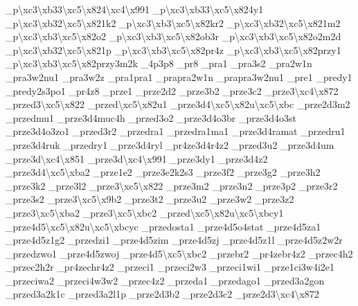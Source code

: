 \begin{DoxyCompactItemize}
\-\_\-p\textbackslash{}xc3\textbackslash{}xb33\textbackslash{}xc5\textbackslash{}x824\textbackslash{}xc4\textbackslash{}x991 \-\_\-p\textbackslash{}xc3\textbackslash{}xb33\textbackslash{}xc5\textbackslash{}x824y1 \-\_\-p\textbackslash{}xc3\textbackslash{}xb32\textbackslash{}xc5\textbackslash{}x821k2 \-\_\-p\textbackslash{}xc3\textbackslash{}xb3\textbackslash{}xc5\textbackslash{}x82kr2 \-\_\-p\textbackslash{}xc3\textbackslash{}xb32\textbackslash{}xc5\textbackslash{}x821m2 \-\_\-p\textbackslash{}xc3\textbackslash{}xb3\textbackslash{}xc5\textbackslash{}x82o2 \-\_\-p\textbackslash{}xc3\textbackslash{}xb3\textbackslash{}xc5\textbackslash{}x82ob3r \-\_\-p\textbackslash{}xc3\textbackslash{}xb3\textbackslash{}xc5\textbackslash{}x82o2m2d \-\_\-p\textbackslash{}xc3\textbackslash{}xb32\textbackslash{}xc5\textbackslash{}x821p \-\_\-p\textbackslash{}xc3\textbackslash{}xb3\textbackslash{}xc5\textbackslash{}x82pr4z \-\_\-p\textbackslash{}xc3\textbackslash{}xb3\textbackslash{}xc5\textbackslash{}x82przy1 \-\_\-p\textbackslash{}xc3\textbackslash{}xb3\textbackslash{}xc5\textbackslash{}x82przy3m2k \-\_\-4p3p8 \-\_\-pr8 \-\_\-pra1 \-\_\-pra3s2 \-\_\-pra2w1n \-\_\-pra3w2nu1 \-\_\-pra3w2z \-\_\-pra1pra1 \-\_\-prapra2w1n \-\_\-prapra3w2nu1 \-\_\-pre1 \-\_\-predy1 \-\_\-predy2s3po1 \-\_\-pr4z8 \-\_\-prze1 \-\_\-prze2d2 \-\_\-prze3b2 \-\_\-prze3c2 \-\_\-prze3\textbackslash{}xc4\textbackslash{}x872 \-\_\-przed3\textbackslash{}xc5\textbackslash{}x822 \-\_\-przed\textbackslash{}xc5\textbackslash{}x82u1 \-\_\-prze3d4\textbackslash{}xc5\textbackslash{}x82u\textbackslash{}xc5\textbackslash{}xbc \-\_\-prze2d3m2 \-\_\-przedmu1 \-\_\-prze3d4muc4h \-\_\-przed3o2 \-\_\-prze3d4o3br \-\_\-prze3d4o3st \-\_\-prze3d4o3zo1 \-\_\-przed3r2 \-\_\-przedra1 \-\_\-przedra1ma1 \-\_\-prze3d4ramat \-\_\-przedru1 \-\_\-prze3d4ruk \-\_\-przedry1 \-\_\-prze3d4ryl \-\_\-pr4ze3d4r4z2 \-\_\-przed3u2 \-\_\-prze3d4um \-\_\-prze3d\textbackslash{}xc4\textbackslash{}x851 \-\_\-prze3d\textbackslash{}xc4\textbackslash{}x991 \-\_\-prze3dy1 \-\_\-prze3d4z2 \-\_\-prze3d4\textbackslash{}xc5\textbackslash{}xba2 \-\_\-prze1e2 \-\_\-prze3e2k2s3 \-\_\-prze3f2 \-\_\-prze3g2 \-\_\-prze3h2 \-\_\-prze3k2 \-\_\-prze3l2 \-\_\-prze3\textbackslash{}xc5\textbackslash{}x822 \-\_\-prze3m2 \-\_\-prze3n2 \-\_\-prze3p2 \-\_\-prze3r2 \-\_\-prze3s2 \-\_\-prze3\textbackslash{}xc5\textbackslash{}x9b2 \-\_\-prze3t2 \-\_\-prze3u2 \-\_\-prze3w2 \-\_\-prze3z2 \-\_\-prze3\textbackslash{}xc5\textbackslash{}xba2 \-\_\-prze3\textbackslash{}xc5\textbackslash{}xbc2 \-\_\-przed\textbackslash{}xc5\textbackslash{}x82u\textbackslash{}xc5\textbackslash{}xbcy1 \-\_\-prze4d5\textbackslash{}xc5\textbackslash{}x82u\textbackslash{}xc5\textbackslash{}xbcyc \-\_\-przedosta1 \-\_\-prze4d5o4stat \-\_\-prze4d5za1 \-\_\-prze4d5z1g2 \-\_\-przedzi1 \-\_\-prze4d5zim \-\_\-prze4d5zj \-\_\-prze4d5z1l \-\_\-prze4d5z2w2r \-\_\-przedzwo1 \-\_\-prze4d5zwoj \-\_\-prze4d5\textbackslash{}xc5\textbackslash{}xbc2 \-\_\-przebr2 \-\_\-pr4zebr4z2 \-\_\-przec4h2 \-\_\-przec2h2r \-\_\-pr4zechr4z2 \-\_\-przeci1 \-\_\-przeci2w3 \-\_\-przeci1wi1 \-\_\-prze1ci3w4i2e1 \-\_\-przeciwa2 \-\_\-przeci4w3w2 \-\_\-przec4z2 \-\_\-przeda1 \-\_\-przedago1 \-\_\-przed3a2gon \-\_\-przed3a2k1c \-\_\-przed3a2l1p \-\_\-prze2d3b2 \-\_\-prze2d3c2 \-\_\-prze2d3\textbackslash{}xc4\textbackslash{}x872 
\end{DoxyCompactItemize}
